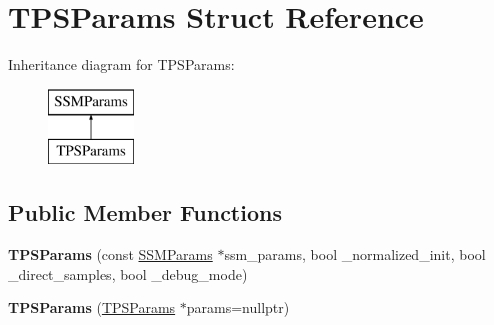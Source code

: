 \hypertarget{structTPSParams}{\section{T\-P\-S\-Params Struct Reference}
\label{structTPSParams}
}
Inheritance diagram for T\-P\-S\-Params\-:\begin{figure}[H]
\begin{center}
\leavevmode
\includegraphics[height=2.000000cm]{structTPSParams}
\end{center}
\end{figure}
\subsection*{Public Member Functions}
\begin{DoxyCompactItemize}
\item 
\hypertarget{structTPSParams_a26f0ce2593b2e7d2dc1754a74f2789db}{{\bfseries T\-P\-S\-Params} (const \hyperlink{structSSMParams}{S\-S\-M\-Params} $\ast$ssm\-\_\-params, bool \-\_\-normalized\-\_\-init, bool \-\_\-direct\-\_\-samples, bool \-\_\-debug\-\_\-mode)}\label{structTPSParams_a26f0ce2593b2e7d2dc1754a74f2789db}

\item 
\hypertarget{structTPSParams_a54442bc56c9e64cf09f9284217ed02ad}{{\bfseries T\-P\-S\-Params} (\hyperlink{structTPSParams}{T\-P\-S\-Params} $\ast$params=nullptr)}\label{structTPSParams_a54442bc56c9e64cf09f9284217ed02ad}

\end{DoxyCompactItemize}
